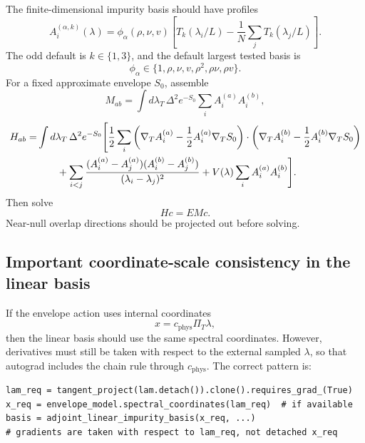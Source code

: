 \documentclass[11pt]{article}
\begin{document}
The finite-dimensional impurity basis should have profiles
\begin{equation}
A_i^{(\alpha,k)}(\lambda)=\phi_\alpha(\rho,\nu,v)
\left[T_k(\lambda_i/L)-\frac1N\sum_jT_k(\lambda_j/L)\right].
\end{equation}
The odd default is \(k\in\{1,3\}\), and the default largest tested basis is
\begin{equation}
\phi_\alpha\in\{1,\rho,\nu,v,\rho^2,\rho\nu,\rho v\}.
\end{equation}
For a fixed approximate envelope \(S_0\), assemble
\begin{equation}
M_{ab}=\int d\lambda_T\,\Delta^2e^{-S_0}\sum_iA_i^{(a)}A_i^{(b)},
\end{equation}
\begin{align}
H_{ab}=&\int d\lambda_T\,\Delta^2e^{-S_0}
\Bigg[
\frac12\sum_i
\left(\nabla_TA_i^{(a)}-\frac12A_i^{(a)}\nabla_TS_0\right)\cdot
\left(\nabla_TA_i^{(b)}-\frac12A_i^{(b)}\nabla_TS_0\right)\notag\\
&\hspace{2em}
+\sum_{i<j}\frac{(A_i^{(a)}-A_j^{(a)})(A_i^{(b)}-A_j^{(b)})}{(\lambda_i-\lambda_j)^2}
+V(\lambda)\sum_iA_i^{(a)}A_i^{(b)}
\Bigg].
\end{align}
Then solve
\begin{equation}
Hc=EMc.
\end{equation}
Near-null overlap directions should be projected out before solving.

\subsection{Important coordinate-scale consistency in the linear basis}

If the envelope action uses internal coordinates
\begin{equation}
x=c_{\mathrm{phys}}\Pi_T\lambda,
\end{equation}
then the linear basis should use the same spectral coordinates. However, derivatives must still be taken with respect to the external sampled \(\lambda\), so that autograd includes the chain rule through \(c_{\mathrm{phys}}\). The correct pattern is:

\begin{lstlisting}[style=pythonstyle]
lam_req = tangent_project(lam.detach()).clone().requires_grad_(True)
x_req = envelope_model.spectral_coordinates(lam_req)  # if available
basis = adjoint_linear_impurity_basis(x_req, ...)
# gradients are taken with respect to lam_req, not detached x_req
\end{lstlisting}
\end{document}

